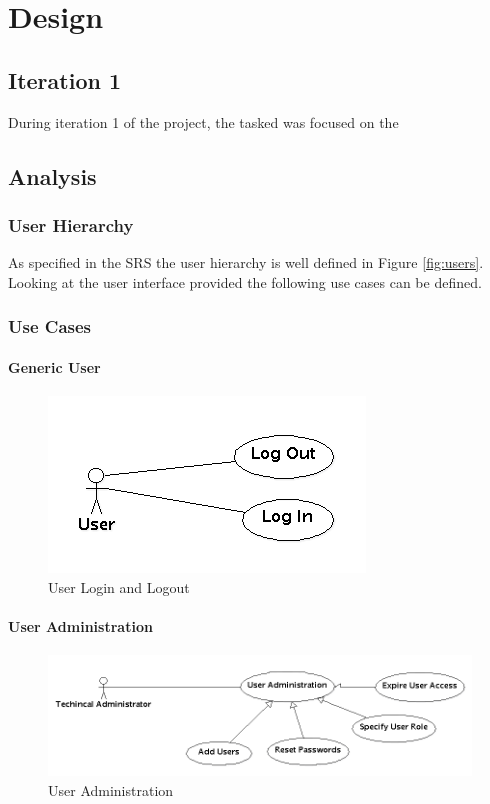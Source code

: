 \documentclass[11pt,a4paper]{report}
\begin{document}
\chapter{Design}
\section{Iteration 1}
During iteration 1 of the project, the tasked was focused on the 
\section{Analysis}

\subsection{User Hierarchy}
As specified in the SRS the user hierarchy is well defined in Figure \ref{fig:users}. Looking at the user interface provided the following use cases can be 
defined.

\subsection{Use Cases}

\subsubsection{ Generic User }

\begin{figure}[htp]
\centering
\includegraphics[scale=0.5]{diagrams/use_cases/User_uc.png}
\caption{User Login and Logout}
\label{fig:UserLog}
\end{figure}



\subsubsection{ User Administration }

\begin{figure}[htp]
\centering
\includegraphics[scale=0.5]{diagrams/use_cases/TechAdmin_uc.png}
\caption{User Administration}
\label{fig:UserAdmin}
\end{figure}
\end{document}
